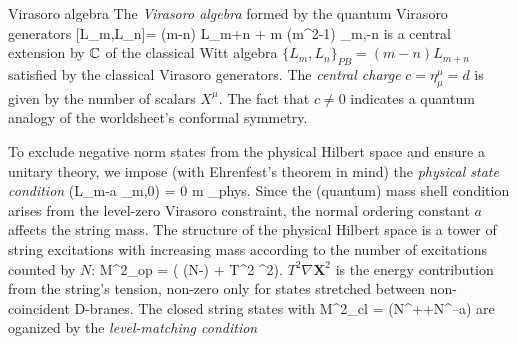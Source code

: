 \begin{mybox}{Virasoro algebra }
	The \emph{Virasoro algebra} formed by the quantum Virasoro generators 
	\be 
	\label{eq:stringVirasoroAlgebra}
	[L_m,L_n]= (m-n) L_{m+n} +  m (m^2-1) \delta_{m,-n}
	\ee 
	is a central extension by $\mathbb{C}$ of the classical Witt algebra $\{L_m,L_n\}_{PB} = (m-n)L_{m+n}$ satisfied by the classical Virasoro generators. The \emph{central charge} $c = \eta^\mu_\mu = d$ is given by the number of scalars $X^\mu$. The fact that $c \neq 0$ indicates a quantum analogy of the worldsheet's conformal symmetry.
\end{mybox}
To exclude negative norm states from the physical Hilbert space and ensure a unitary theory, we impose (with Ehrenfest's theorem in mind) the \emph{physical state condition} 
\be 
\label{eq:stringPhysicalStatecond}
(L_m-a \delta_{m,0}) \ket{\phi} = 0 \quad \forall m   \forall \ket{\phi}\in \mH_{phys}.
\ee 
Since the (quantum) mass shell condition arises from the level-zero Virasoro constraint, the normal ordering constant $a$ affects the string mass. The structure of the physical Hilbert space is a tower of string excitations with increasing mass according to the number of excitations counted by $N$:
\be
M^2_{op} \ket{\phi} = \left( (N-\alpha) + T^2 \Delta {}^2\right)\ket{\phi}.
\ee 
$T^2 \nabla \mathbf{X}^2$ is the energy contribution from the string's tension, non-zero only for states stretched between non-coincident D-branes. The closed string states with
\bse 
M^2_{cl} \ket{\phi} =  (N^++N^--a) \ket{\phi}
\ese 
are oganized by the \emph{level-matching condition}

